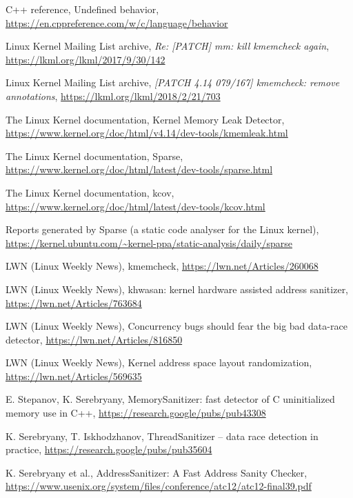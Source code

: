 \documentclass[shortabstract, manyadvisors, english, mgr]{iithesis}
\theoremstyle{definition} \newtheorem*{definition}{Definicja}
\theoremstyle{definition} \newtheorem*{example}{Przykład}
\theoremstyle{definition} \newtheorem*{remark}{Uwaga}
\begin{document}
\begin{thebibliography}{99}
C++ reference, Undefined behavior,
\url{https://en.cppreference.com/w/c/language/behavior}

Linux Kernel Mailing List archive,
\textit{Re: [PATCH] mm: kill kmemcheck again},
\url{https://lkml.org/lkml/2017/9/30/142}

Linux Kernel Mailing List archive,
\textit{[PATCH 4.14 079/167] kmemcheck: remove annotations},
\url{https://lkml.org/lkml/2018/2/21/703}

The Linux Kernel documentation,
Kernel Memory Leak Detector,
\url{https://www.kernel.org/doc/html/v4.14/dev-tools/kmemleak.html}

The Linux Kernel documentation,
Sparse,
\url{https://www.kernel.org/doc/html/latest/dev-tools/sparse.html}

The Linux Kernel documentation,
kcov,
\url{https://www.kernel.org/doc/html/latest/dev-tools/kcov.html}

Reports generated by Sparse (a static code analyser for the Linux kernel),
\url{https://kernel.ubuntu.com/~kernel-ppa/static-analysis/daily/sparse}

LWN (Linux Weekly News),
kmemcheck,
\url{https://lwn.net/Articles/260068}

LWN (Linux Weekly News),
khwasan: kernel hardware assisted address sanitizer,
\url{https://lwn.net/Articles/763684}

LWN (Linux Weekly News),
Concurrency bugs should fear the big bad data-race detector,
\url{https://lwn.net/Articles/816850}

LWN (Linux Weekly News),
Kernel address space layout randomization,
\url{https://lwn.net/Articles/569635}

E. Stepanov, K. Serebryany,
MemorySanitizer: fast detector of C uninitialized memory use in C++,
\url{https://research.google/pubs/pub43308}

K. Serebryany, T. Iskhodzhanov,
ThreadSanitizer – data race detection in practice,
\url{https://research.google/pubs/pub35604}

K. Serebryany et al.,
AddressSanitizer: A Fast Address Sanity Checker,
\url{https://www.usenix.org/system/files/conference/atc12/atc12-final39.pdf}


\end{thebibliography}
\end{document}
